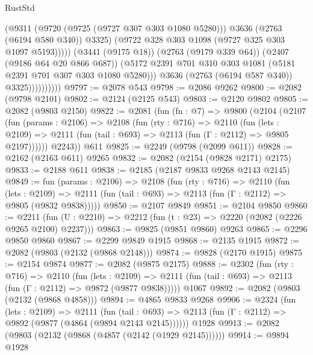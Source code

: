 \begin{lexlean}{RustStd}
\begin{coremodule}
                                (@9311
                                  (@9720 (@9725 (@9727 @307 @303 @1080 @5280)))
                                  @3636
                                  (@2763 (@6194 @580 @340))
                                  @3325)
                                (@9722 @328 @303 @1098 (@9727 @325 @303 @1097 @5193)))))
                          (@3441 (@9175 @18))
                          (@2763 (@9179 @339 @64))
                          (@2407 (@9186 @64 @20 @866 @687))
                          (@5172
                            @2391
                            @701
                            @310
                            @303
                            @1081
                            (@5181 @2391 @701 @307 @303 @1080 @5280)))
                        @3636
                        (@2763 (@6194 @587 @340))
                        @3325))))))))))
@9797 := @2078 @543
@9798 := @2086 @9262
@9800 := @2082 (@9798 @2101)
@9802 := @2124 (@2125 @543)
@9803 := @2120 @9802
@9805 := @2082 (@9803 @2150)
@9822 := @2081
    (fun (fn : @7) =>
    @9800
      (@2104
        (@2107
          (fun (params : @2106) =>
          @2108
            (fun (rty : @716) =>
            @2110
              (fun (lets : @2109) =>
              @2111 (fun (tail : @693) => @2113 (fun (Γ : @2112) => @9805 @2197))))))
        @2243))
    @611
@9825 := @2249 (@9798 (@2099 @611))
@9828 := @2162 (@2163 @611) @9265
@9832 := @2082 (@2154 (@9828 @2171) @2175)
@9833 := @2188 @611
@9838 := @2185 (@2187 @9833 @9268 @2143 @2145)
@9849 := fun (params : @2106) =>
  @2108
    (fun (rty : @716) =>
    @2110
      (fun (lets : @2109) =>
      @2111 (fun (tail : @693) => @2113 (fun (Γ : @2112) => @9805 (@9832 @9838)))))
@9850 := @2107 @9849
@9851 := @2104 @9850
@9860 := @2211 (fun (U : @2210) => @2212 (fun (t : @23) => @2220 (@2082 (@2226 @9265 @2100) @2237)))
@9863 := @9825 (@9851 @9860) @9263
@9865 := @2296 @9850 @9860
@9867 := @2299 @9849 @1915
@9868 := @2135 @1915
@9872 := @2082 (@9803 (@2132 (@9868 @2148)))
@9874 := @9828 (@2170 @1915)
@9875 := @2154 @9874
@9877 := @2082 (@9875 @2175)
@9888 := @2302
    (fun (rty : @716) =>
    @2110
      (fun (lets : @2109) =>
      @2111 (fun (tail : @693) => @2113 (fun (Γ : @2112) => @9872 (@9877 @9838)))))
    @1067
@9892 := @2082 (@9803 (@2132 (@9868 @4858)))
@9894 := @4865 @9833 @9268
@9906 := @2324
    (fun (lets : @2109) =>
    @2111
      (fun (tail : @693) => @2113 (fun (Γ : @2112) => @9892 (@9877 (@4864 (@9894 @2143 @2145))))))
    @1928
@9913 := @2082 (@9803 (@2132 (@9868 (@4857 (@2142 (@1929 @2145))))))
@9914 := @9894 @1928

\end{coremodule}
\end{lexlean}
